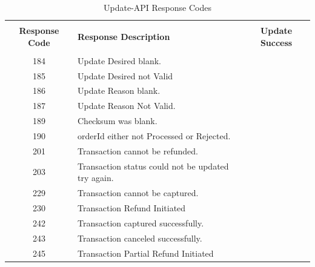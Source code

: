 \documentclass{article}
\newcommand{\cmark}{\ding{51}}
\newcommand{\xmark}{\ding{55}}
\begin{document}
\begin{longtable}{||c|p{10.5cm}||c||}
   \rowcolor{white}
   \caption{Update-API Response Codes}\\
   \rowcolor{green!50}
\bfseries{Response Code} & \bfseries{Response Description} & \bfseries{Update Success} \\ \hline & & \\
184 &Update Desired blank.& \textcolor{red} {\xmark} \\
185 &Update Desired not Valid& \textcolor{red} {\xmark} \\
186 &Update Reason blank.& \textcolor{red} {\xmark} \\
187 &Update Reason Not Valid.& \textcolor{red} {\xmark} \\
189 &Checksum was blank.& \textcolor{red} {\xmark} \\
190 &orderId either not Processed or Rejected.& \textcolor{red} {\xmark} \\
201 &Transaction cannot be refunded.& \textcolor{red} {\xmark} \\
203 &Transaction status could not be updated try again.& \textcolor{red} {\xmark} \\
229 &Transaction cannot be captured.& \textcolor{red} {\xmark} \\
230 &Transaction Refund Initiated&\textcolor{green} {\cmark}\\
242 &Transaction captured successfully.&\textcolor{green} {\cmark}\\
243 &Transaction canceled successfully.&\textcolor{green} {\cmark}\\
245 &Transaction Partial Refund Initiated&\textcolor{green} {\cmark}\\
\end{longtable}
\end{document}
